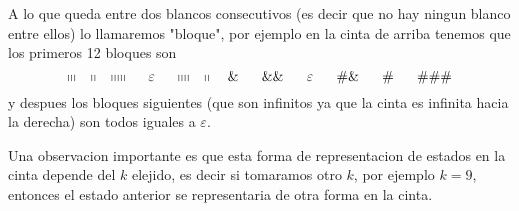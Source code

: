 \begin{frame}
	A lo que queda entre dos blancos consecutivos (es decir que no hay ningun
	blanco entre ellos) lo llamaremos "bloque", por ejemplo en la cinta de
	arriba tenemos que los primeros 12 bloques son%
	\begin{equation*}
	\shortmid \shortmid \shortmid \ \ \ \shortmid \shortmid \ \ \ \shortmid
	\shortmid \shortmid \shortmid \shortmid \ \ \ \ \varepsilon \ \ \ \
	\shortmid \shortmid \shortmid \shortmid \ \ \ \shortmid \shortmid \ \ \ \&\
	\ \ \ \ \&\&\ \ \ \ \ \varepsilon \ \ \ \ \ \#\&\ \ \ \ \ \#\ \ \ \ \ \#\#\#
	\end{equation*}%
	y despues los bloques siguientes (que son infinitos ya que la cinta es
	infinita hacia la derecha) son todos iguales a $\varepsilon $.

	Una observacion importante es que esta forma de representacion de estados en
	la cinta depende del $k$ elejido, es decir si tomaramos otro $k$, por
	ejemplo $k=9$, entonces el estado anterior se representaria de otra forma en
	la cinta.
\end{frame}

